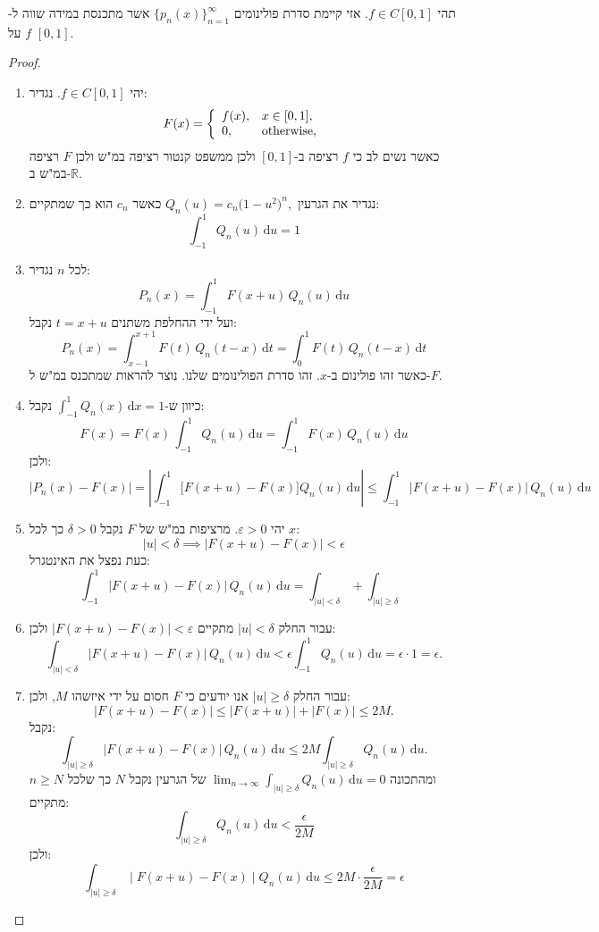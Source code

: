 \documentclass{tstextbook}
\begin{document}
\begin{theorem}
תהי \(f \in C[0,1]\). אזי קיימת סדרת פולינומים \(\{ p_{n}(x) \}_{n=1}^{\infty}\) אשר מתכנסת במידה שווה ל-\(f\) על \([0,1]\).

\end{theorem}
\begin{proof}
  \begin{enumerate}
    \item יהי \(f \in C[0,1]\). נגדיר: 
$$F(x)={\left\{\begin{array}{l l}{f(x),}&{x\in[0,1],}\\ {0,}&{{\mathrm{otherwise}},}\end{array}\right.}$$
כאשר נשים לב כי \(f\) רציפה ב-\([0,1]\) ולכן ממשפט קנטור רציפה במ"ש ולכן \(F\) רציפה במ"ש ב-\(\mathbb{R}\).


    \item נגדיר את הגרעין \(Q_{n}(u)=c_{n}{{\bigl(}1-u^{2}{\bigr)}^{n}},\) כאשר \(c_{n}\) הוא כך שמתקיים: 
$$\int_{-1}^{1}Q_{n}(u)\,\mathrm{d}u=1$$


    \item לכל \(n\) נגדיר: 
$$P_{n}(x)=\int_{-1}^{1}F(x+u)\,Q_{n}(u)\,\mathrm{d}u$$
ועל ידי ההחלפת משתנים \(t=x+u\) נקבל:
$$P_{n}(x)=\int_{x-1}^{x+1}F(t)\,Q_{n}(t-x)\,\mathrm{d}t=\int_{0}^{1}F(t)\,Q_{n}(t-x)\,\mathrm{d}t$$
כאשר זהו פולינום ב-\(x\). זהו סדרת הפולינומים שלנו. נוצר להראות שמתכנס במ"ש ל-\(F\).


    \item כיוון ש-\(\int_{-1}^{1} Q_{n}(x) \, \mathrm{d}x=1\) נקבל: 
$$F(x)=F(x)\,\int_{-1}^{1}Q_{n}(u)\,\mathrm{d}u=\int_{-1}^{1}F(x)\,Q_{n}(u)\,\mathrm{d}u$$
ולכן:
$$\left|P_{n}(x)-F(x)\right|=\left|\int_{-1}^{1}\bigl[F(x+u)-F(x)\bigr]Q_{n}(u)\,\mathrm{d}u\right|\leq\int_{-1}^{1}\bigl|F(x+u)-F(x)\bigr|\,Q_{n}(u)\,\mathrm{d}u$$


    \item יהי \(\varepsilon> 0\). מרציפות במ"ש של \(F\) נקבל \(\delta > 0\) כך לכל \(x\): 
$$|u|<\delta\implies|F(x+u)-F(x)|<\epsilon$$
כעת נפצל את האינטגרל:
$$\int_{-1}^{1}\!|F(x+u)-F(x)|\,Q_{n}(u)\,\mathrm{d}u=\int_{|u|<\delta}+\int_{|u|\geq\delta}$$


    \item עבור החלק \(\lvert u \rvert<\delta\) מתקיים \(\lvert F(x+u)-F(x) \rvert<\varepsilon\) ולכן: 
$$\int_{|u|<\delta}|F(x+u)-F(x)|\,Q_{n}(u)\,\mathrm{d}u<\epsilon\int_{-1}^{1}Q_{n}(u)\,\mathrm{d}u=\epsilon\cdot1=\epsilon.$$


    \item עבור החלק \(\lvert u \rvert\geq \delta\) אנו יודעים כי \(F\) חסום על ידי איזשהו \(M\), ולכן: 
$$|F(x+u)-F(x)|\leq|F(x+u)|+|F(x)|\leq2M.$$
נקבל:
$$\int_{|u|\geq\delta}|F(x+u)-F(x)|\,Q_{n}(u)\,\mathrm{d}u\leq2M\int_{|u|\geq\delta}Q_{n}(u)\,\mathrm{d}u.$$
ומהתכונה \(\operatorname*{lim}_{n\to\infty}\int_{|u|\geq\delta}Q_{n}(u)\,\mathrm{d}u=0\) של הגרעין נקבל \(N\) כך שלכל \(n\geq N\) מתקיים:
$$\int_{|u|\geq\delta}Q_{n}(u)\,\mathrm{d}u<{\frac{\epsilon}{2M}}$$
ולכן:
$$\int_{|u|\geq\delta}\mid\!F(x+u)-F(x)\!\mid Q_{n}(u)\,\mathrm{d}u\leq2M\cdot\frac{\epsilon}{2M}=\epsilon$$



\end{enumerate}
\end{proof}
\end{document}
